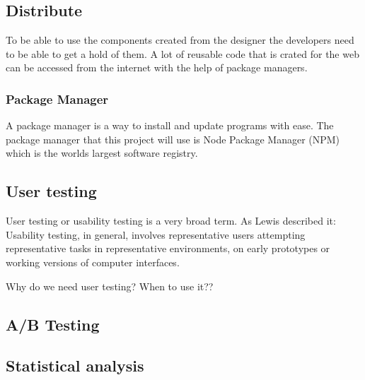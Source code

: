 \subsection{Distribute}%
\label{sub:Distribute}
To be able to use the components created from the designer the developers need to be able to get a hold of them. A lot of reusable code that is crated for the web can be accessed from the internet with the help of package managers.

\subsubsection{Package Manager}%
\label{sub:Package Manager}
\cite{PackageManager2020} 

A package manager is a way to install and update programs with ease. The package manager that this project will use is Node Package Manager (NPM) which is the worlds largest software registry\cite{NpmNpmDocs}.





\subsection{User testing}%
\label{sub:User testing}
User testing or usability testing is a very broad term. As Lewis \cite{lewis2006usability} described it: Usability testing, in general, involves representative users attempting representative tasks in representative environments, on early prototypes or working versions of computer interfaces.

Why do we need user testing?
When to use it??




\cite{nielsen1994estimating} 

\cite{nielsen1994heuristic} 


\subsection{A/B Testing}%
\label{sub:A/B Testing}


\subsection{Statistical analysis}%
\label{sub:Statistical analysis}

